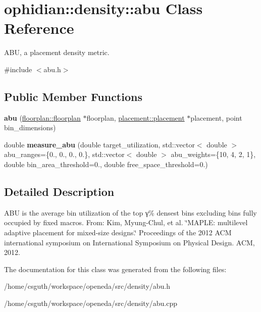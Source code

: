 \hypertarget{classophidian_1_1density_1_1abu}{\section{ophidian\-:\-:density\-:\-:abu Class Reference}
\label{classophidian_1_1density_1_1abu}
}


A\-B\-U, a placement density metric.  




{\ttfamily \#include $<$abu.\-h$>$}

\subsection*{Public Member Functions}
\begin{DoxyCompactItemize}
\item 
\hypertarget{classophidian_1_1density_1_1abu_aa41e259498a9c3524433c46805331fe0}{{\bfseries abu} (\hyperlink{classophidian_1_1floorplan_1_1floorplan}{floorplan\-::floorplan} $\ast$floorplan, \hyperlink{classophidian_1_1placement_1_1placement}{placement\-::placement} $\ast$placement, point bin\-\_\-dimensions)}\label{classophidian_1_1density_1_1abu_aa41e259498a9c3524433c46805331fe0}

\item 
\hypertarget{classophidian_1_1density_1_1abu_ab0c9e7154902f96db549a704e310c937}{double {\bfseries measure\-\_\-abu} (double target\-\_\-utilization, std\-::vector$<$ double $>$ abu\-\_\-ranges=\{0., 0., 0., 0.\}, std\-::vector$<$ double $>$ abu\-\_\-weights=\{10, 4, 2, 1\}, double bin\-\_\-area\-\_\-threshold=0., double free\-\_\-space\-\_\-threshold=0.)}\label{classophidian_1_1density_1_1abu_ab0c9e7154902f96db549a704e310c937}

\end{DoxyCompactItemize}


\subsection{Detailed Description}
A\-B\-U is the average bin utilization of the top γ\% densest bins excluding bins fully occupied by fixed macros. From\-: Kim, Myung-\/\-Chul, et al. \char`\"{}\-M\-A\-P\-L\-E\-: multilevel adaptive placement for mixed-\/size designs.\char`\"{} Proceedings of the 2012 A\-C\-M international symposium on International Symposium on Physical Design. A\-C\-M, 2012. 

The documentation for this class was generated from the following files\-:\begin{DoxyCompactItemize}
\item 
/home/csguth/workspace/openeda/src/density/abu.\-h\item 
/home/csguth/workspace/openeda/src/density/abu.\-cpp\end{DoxyCompactItemize}
